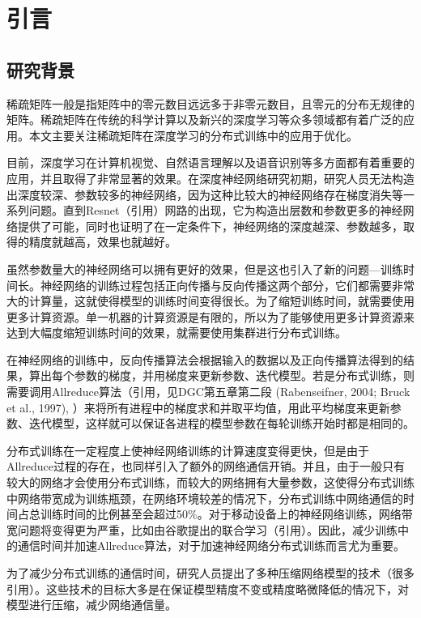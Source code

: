 \chapter{引言}
\label{chap1}

\section{研究背景}
稀疏矩阵一般是指矩阵中的零元数目远远多于非零元数目，且零元的分布无规律的矩阵。稀疏矩阵在传统的科学计算以及新兴的深度学习等众多领域都有着广泛的应用。本文主要关注稀疏矩阵在深度学习的分布式训练中的应用于优化。

目前，深度学习在计算机视觉、自然语言理解以及语音识别等多方面都有着重要的应用，并且取得了非常显著的效果。在深度神经网络研究初期，研究人员无法构造出深度较深、参数较多的神经网络，因为这种比较大的神经网络存在梯度消失等一系列问题。直到Resnet（引用）网路的出现，它为构造出层数和参数更多的神经网络提供了可能，同时也证明了在一定条件下，神经网络的深度越深、参数越多，取得的精度就越高，效果也就越好。

虽然参数量大的神经网络可以拥有更好的效果，但是这也引入了新的问题---训练时间长。神经网络的训练过程包括正向传播与反向传播这两个部分，它们都需要非常大的计算量，这就使得模型的训练时间变得很长。为了缩短训练时间，就需要使用更多计算资源。单一机器的计算资源是有限的，所以为了能够使用更多计算资源来达到大幅度缩短训练时间的效果，就需要使用集群进行分布式训练。

在神经网络的训练中，反向传播算法会根据输入的数据以及正向传播算法得到的结果，算出每个参数的梯度，并用梯度来更新参数、迭代模型。若是分布式训练，则需要调用Allreduce算法（引用，见DGC第五章第二段 (Rabenseifner, 2004; Bruck et al., 1997), ）来将所有进程中的梯度求和并取平均值，用此平均梯度来更新参数、迭代模型，这样就可以保证各进程的模型参数在每轮训练开始时都是相同的。

分布式训练在一定程度上使神经网络训练的计算速度变得更快，但是由于Allreduce过程的存在，也同样引入了额外的网络通信开销。并且，由于一般只有较大的网络才会使用分布式训练，而较大的网络拥有大量参数，这使得分布式训练中网络带宽成为训练瓶颈，在网络环境较差的情况下，分布式训练中网络通信的时间占总训练时间的比例甚至会超过50\%。对于移动设备上的神经网络训练，网络带宽问题将变得更为严重，比如由谷歌提出的联合学习（引用）。因此，减少训练中的通信时间并加速Allreduce算法，对于加速神经网络分布式训练而言尤为重要。

为了减少分布式训练的通信时间，研究人员提出了多种压缩网络模型的技术（很多引用）。这些技术的目标大多是在保证模型精度不变或精度略微降低的情况下，对模型进行压缩，减少网络通信量。

